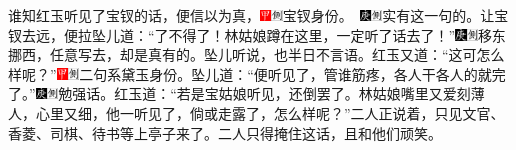 谁知红玉听见了宝钗的话，便信以为真，{\includegraphics[width=3mm]{../Images/00002}\includegraphics[width=3mm]{../Images/00011}\footnotesize \kaishu 宝钗身份。　\includegraphics[width=3mm]{../Images/00004}\includegraphics[width=3mm]{../Images/00011}\footnotesize \kaishu 实有这一句的。}让宝钗去远，便拉坠儿道：“了不得了！林姑娘蹲在这里，一定听了话去了！”{\includegraphics[width=3mm]{../Images/00004}\includegraphics[width=3mm]{../Images/00011}\footnotesize \kaishu 移东挪西，任意写去，却是真有的。}坠儿听说，也半日不言语。红玉又道：“这可怎么样呢？”{\includegraphics[width=3mm]{../Images/00002}\includegraphics[width=3mm]{../Images/00011}\footnotesize \kaishu 二句系黛玉身份。}坠儿道：“便听见了，管谁筋疼，各人干各人的就完了。”{\includegraphics[width=3mm]{../Images/00004}\includegraphics[width=3mm]{../Images/00011}\footnotesize \kaishu 勉强话。}红玉道：“若是宝姑娘听见，还倒罢了。林姑娘嘴里又爱刻薄人，心里又细，他一听见了，倘或走露了，怎么样呢？”二人正说着，只见文官、香菱、司棋、待书等上亭子来了。二人只得掩住这话，且和他们顽笑。

